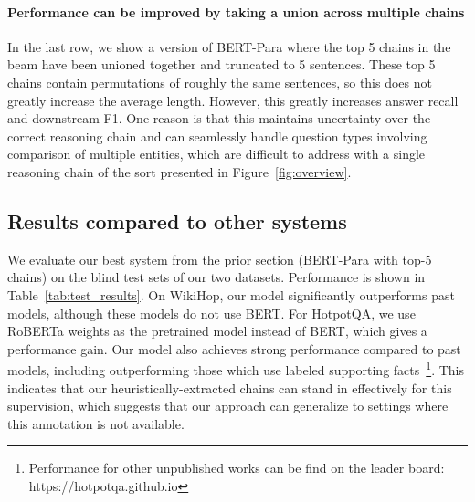 \documentclass[11pt,a4paper]{article}
\begin{document}
\paragraph{Performance can be improved by taking a union across multiple chains} In the last row, we show a version of BERT-Para where the top 5 chains in the beam have been unioned together and truncated to 5 sentences. These top 5 chains contain permutations of roughly the same sentences, so this does not greatly increase the average length. However, this greatly increases answer recall and downstream F1. One reason is that this maintains uncertainty over the correct reasoning chain and can seamlessly handle question types involving comparison of multiple entities, which are difficult to address with a single reasoning chain of the sort presented in Figure~\ref{fig:overview}.

\subsection{Results compared to other systems}
We evaluate our best system from the prior section (BERT-Para with top-5 chains) on the blind test sets of our two datasets. Performance is shown in Table~\ref{tab:test_results}. On WikiHop, our model significantly outperforms past models, although these models do not use BERT. For HotpotQA, we use RoBERTa \citep{roberta} weights as the pretrained model instead of BERT, which gives a performance gain. Our model also achieves strong performance compared to past models, including outperforming those which use labeled supporting facts~\footnote{Performance for other unpublished works can be find on the leader board: https://hotpotqa.github.io}. This indicates that our heuristically-extracted chains can stand in effectively for this supervision, which suggests that our approach can generalize to settings where this annotation is not available.
\end{document}
